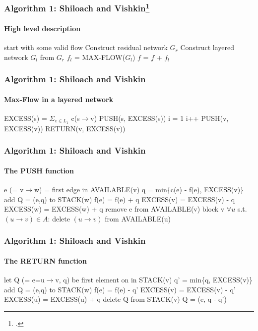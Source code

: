 \documentclass{beamer}
\begin{document}
\begin{frame}
\frametitle{Algorithm 1: Shiloach and Vishkin\footcite{yossi81}}
\framesubtitle{High level description}
	\begin{algorithmic}[1]
	\State start with some valid flow 
	 \Comment{\textcolor{OliveGreen}{$O(\lvert V \rvert)$}}	
		\State Construct residual network $G_r$ \Comment{\textcolor{OliveGreen}{$O(\lvert V \rvert)$, $p=O(\lvert V \rvert)$}}
		\State Construct layered network $G_l$ from $G_r$ 
		\State $f_l$ = MAX-FLOW($G_l$)  
		\State $f$ = $f$ + $f_l$ \Comment{\textcolor{OliveGreen}{$O(\lvert V \rvert)$}}
	\EndWhile
	\EndFunction
	\end{algorithmic}
\end{frame}

\begin{frame}
\frametitle{Algorithm 1: Shiloach and Vishkin}
\framesubtitle{Max-Flow in a layered network}	
	\begin{algorithmic}[1]
		\State EXCESS(s) = $\Sigma_{v \in L_1}$ c(s$\rightarrow$v)
		\State PUSH(s, EXCESS(s))
		\State i = 1
			\State i++
				\State PUSH(v, EXCESS(v))
			\EndIf
			\State RETURN(v, EXCESS(v))
		\EndWhile
	
	\EndFunction
	\end{algorithmic}
\end{frame}

\begin{frame}[shrink]
\frametitle{Algorithm 1: Shiloach and Vishkin}
\framesubtitle{The PUSH function}
	\begin{algorithmic}[1]
			\State e (= v$\rightarrow$w) = first edge in AVAILABLE(v)
			\State q = min\{c(e) - f(e), EXCESS(v)\}
			\State add Q = (e,q) to STACK(w)
			\State f(e) = f(e) + q
			\State EXCESS(v) = EXCESS(v) - q
			\State EXCESS(w) = EXCESS(w) + q
				\State remove e from AVAILABLE(v)
			\EndIf
		\EndWhile
	 		\State block v
\State $\forall u$ s.t. $(u \rightarrow v) \in A$: delete $(u\rightarrow v)$ from AVAILABLE(u) 
	 	\EndIf
	\EndFunction
	\end{algorithmic}
\end{frame}

\begin{frame}[shrink]
\frametitle{Algorithm 1: Shiloach and Vishkin}
\framesubtitle{The RETURN function}
	\begin{algorithmic}[1]
			\State let Q (= e=u$\rightarrow$v, q) be first element on in STACK(v)
			\State q' = min\{q, EXCESS(v)\}
			\State add Q = (e,q) to STACK(w)
			\State f(e) = f(e) - q'
			\State EXCESS(v) = EXCESS(v) - q'
			\State EXCESS(u) = EXCESS(u) + q
				\State delete Q from STACK(v)
			\Else
				\State Q = (e, q - q')
			\EndIf
		\EndWhile
	\EndFunction
	\end{algorithmic}
\end{frame}
\end{document}
